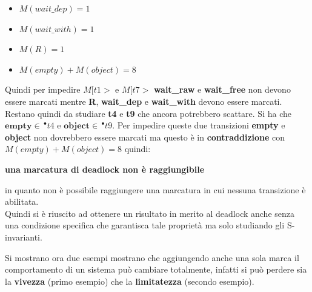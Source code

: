 \documentclass[a4paper,12pt, oneside]{book}
\begin{document}
\begin{esempio}
  \begin{itemize}
    \item $M(wait\_dep) = 1$
    \item $M(wait\_with) = 1$
    \item $M(R) = 1$
    \item $M(empty) + M(object) = 8$
  \end{itemize}
  Quindi per impedire $M[t1> \mbox{ e } M[t7>$ \textbf{wait\_raw} e
  \textbf{wait\_free} non devono essere marcati mentre \textbf{R},
  \textbf{wait\_dep} e \textbf{wait\_with} devono essere marcati.\\
  Restano quindi da studiare \textbf{t4} e \textbf{t9} che ancora potrebbero
  scattare. Si ha che $\mathbf{empty}\in \,^\bullet t4$ e $\mathbf{object}\in
  \,^\bullet t9$. Per impedire queste due  transizioni \textbf{empty} e
  \textbf{object} non dovrebbero essere marcati ma questo è in
  \textbf{contraddizione} con $M(empty) + M(object) = 8$ quindi:
  \begin{center}
    \textbf{una marcatura di deadlock non è raggiungibile}
  \end{center}
  in quanto non è possibile raggiungere una marcatura in cui nessuna transizione
  è abilitata.\\
  Quindi si è riuscito ad ottenere un risultato in merito al deadlock anche
  senza una condizione specifica che garantisca tale proprietà ma solo studiando
  gli S-invarianti.
\end{esempio}
\newpage
Si mostrano ora due esempi mostrano che aggiungendo anche una sola marca il
comportamento di un sistema può cambiare totalmente, infatti si può perdere sia
la \textbf{vivezza} (primo esempio) che la \textbf{limitatezza} (secondo
esempio). 
\end{document}
